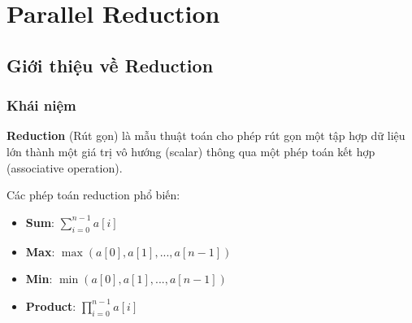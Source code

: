 \chapter{Parallel Reduction}
\label{chap:reduction}

\section{Giới thiệu về Reduction}

\subsection{Khái niệm}

\textbf{Reduction} (Rút gọn) là mẫu thuật toán cho phép rút gọn một tập hợp dữ liệu lớn thành một giá trị vô hướng (scalar) thông qua một phép toán kết hợp (associative operation).

Các phép toán reduction phổ biến:
\begin{itemize}
    \item \textbf{Sum}: $\sum_{i=0}^{n-1} a[i]$
    \item \textbf{Max}: $\max(a[0], a[1], ..., a[n-1])$
    \item \textbf{Min}: $\min(a[0], a[1], ..., a[n-1])$
    \item \textbf{Product}: $\prod_{i=0}^{n-1} a[i]$
\end{itemize}

